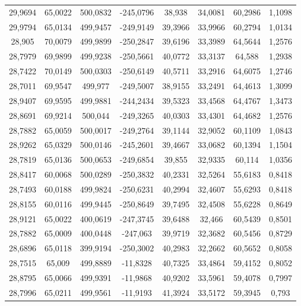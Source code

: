 \begin{longtable}{@{}cccccccc@{}}
29,9694 & 65,0022 & 500,0832 & -245,0796 & 38,938 & 34,0081 & 60,2986 & 1,1098 \\
29,9794 & 65,0134 & 499,9457 & -249,9149 & 39,3966 & 33,9966 & 60,2794 & 1,0134 \\
28,905 & 70,0079 & 499,9899 & -250,2847 & 39,6196 & 33,3989 & 64,5644 & 1,2576 \\
28,7979 & 69,9899 & 499,9238 & -250,5661 & 40,0772 & 33,3137 & 64,588 & 1,2938 \\
28,7422 & 70,0149 & 500,0303 & -250,6149 & 40,5711 & 33,2916 & 64,6075 & 1,2746 \\
28,7011 & 69,9547 & 499,977 & -249,5007 & 38,9155 & 33,2491 & 64,4613 & 1,3099 \\
28,9407 & 69,9595 & 499,9881 & -244,2434 & 39,5323 & 33,4568 & 64,4767 & 1,3473 \\
28,8691 & 69,9214 & 500,044 & -249,3265 & 40,0303 & 33,4301 & 64,4682 & 1,2576 \\
28,7882 & 65,0059 & 500,0017 & -249,2764 & 39,1144 & 32,9052 & 60,1109 & 1,0843 \\
28,9262 & 65,0329 & 500,0146 & -245,2601 & 39,4667 & 33,0682 & 60,1394 & 1,1504 \\
28,7819 & 65,0136 & 500,0653 & -249,6854 & 39,855 & 32,9335 & 60,114 & 1,0356 \\
28,8417 & 60,0068 & 500,0289 & -250,3832 & 40,2331 & 32,5264 & 55,6183 & 0,8418 \\
28,7493 & 60,0188 & 499,9824 & -250,6231 & 40,2994 & 32,4607 & 55,6293 & 0,8418 \\
28,8155 & 60,0116 & 499,9445 & -250,8649 & 39,7495 & 32,4508 & 55,6228 & 0,8649 \\
28,9121 & 65,0022 & 400,0619 & -247,3745 & 39,6488 & 32,466 & 60,5439 & 0,8501 \\
28,7882 & 65,0009 & 400,0448 & -247,063 & 39,9719 & 32,3682 & 60,5456 & 0,8729 \\
28,6896 & 65,0118 & 399,9194 & -250,3002 & 40,2983 & 32,2662 & 60,5652 & 0,8058 \\
28,7515 & 65,009 & 499,8889 & -11,8328 & 40,7325 & 33,4864 & 59,4152 & 0,8052 \\
28,8795 & 65,0066 & 499,9391 & -11,9868 & 40,9202 & 33,5961 & 59,4078 & 0,7997 \\
28,7996 & 65,0211 & 499,9561 & -11,9193 & 41,3924 & 33,5172 & 59,3945 & 0,793 \\

\end{longtable}
\endgroup


